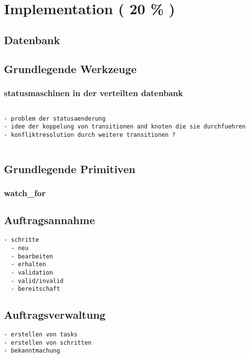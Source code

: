 \chapter{Implementation ( 20 \% ) }
\section{Datenbank}
\section{Grundlegende Werkzeuge}
\subsection{statusmaschinen in der verteilten datenbank}

\begin{verbatim}

- problem der statusaenderung
- idee der koppelung von transitionen and knoten die sie durchfuehren
- konfliktresolution durch weitere transitionen ?


\end{verbatim}
\section{Grundlegende Primitiven}

\subsection{watch\_for}



\section{Auftragsannahme}

\begin{verbatim}
- schritte
  - neu
  - bearbeiten
  - erhalten
  - validation
  - valid/invalid
  - bereitschaft
\end{verbatim}

\section{Auftragsverwaltung}

\begin{verbatim}
- erstellen von tasks
- erstellen von schritten
- bekanntmachung
\end{verbatim}


